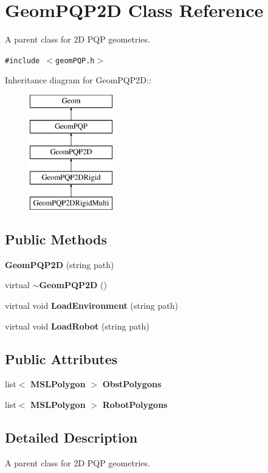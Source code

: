 \section{Geom\-PQP2D  Class Reference}
\label{classGeomPQP2D}
A parent class for 2D PQP geometries. 


{\tt \#include $<$geom\-PQP.h$>$}

Inheritance diagram for Geom\-PQP2D::\begin{figure}[H]
\begin{center}
\leavevmode
\includegraphics[height=5cm]{classGeomPQP2D}
\end{center}
\end{figure}
\subsection*{Public Methods}
\begin{CompactItemize}
\item 
{\bf Geom\-PQP2D} (string path)
\item 
virtual {\bf $\sim$Geom\-PQP2D} ()
\item 
virtual void {\bf Load\-Environment} (string path)
\item 
virtual void {\bf Load\-Robot} (string path)
\end{CompactItemize}
\subsection*{Public Attributes}
\begin{CompactItemize}
\item 
list$<$ {\bf MSLPolygon} $>$ {\bf Obst\-Polygons}
\item 
list$<$ {\bf MSLPolygon} $>$ {\bf Robot\-Polygons}
\end{CompactItemize}


\subsection{Detailed Description}
A parent class for 2D PQP geometries.



